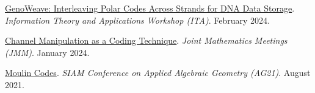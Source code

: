 \documentclass{article}
\def\sec#1{\vskip1em\textbf{\fs1#1}}
\def\fs#1{%
        \pgfmathsetmacro\a{#1}%
        \pgfmathsetmacro\A{\parskip*(4/3)^\a}%
        \pgfmathsetmacro\B{\A*(4/3)}%
        \fontsize{\A pt}{\B pt}\selectfont%
    }
\begin{document}
\bgroup
\def\section#1#2{\sec{Invited Talks \mdseries (new to old)}}
\begin{thebibliography}{T9}
    \href{https://ita.ucsd.edu/workshop/schedule}
    {GenoWeave: Interleaving Polar Codes Across Strands for DNA Data Storage}.
    \emph{Information Theory and Applications Workshop (ITA)}.
    February 2024.

    \href{https://meetings.ams.org/math/jmm2024/meetingapp.cgi/Paper/29146}
    {Channel Manipulation as a Coding Technique}.
    \emph{Joint Mathematics Meetings (JMM)}.
    January 2024.

    \href{https://meetings.siam.org/sess/dsp_programsess.cfm?SESSIONCODE=72368}
    {Moulin Codes}.
    \emph{SIAM Conference on Applied Algebraic Geometry (AG21)}.
    August 2021.
\end{thebibliography}
\egroup
\end{document}
